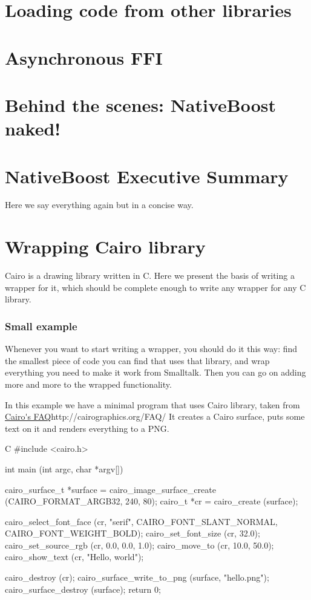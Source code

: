 \documentclass[a4paper,10pt,twoside]{book}
\begin{document}
\section{Loading code from other libraries}

\section{Asynchronous FFI}

\section{Behind the scenes: NativeBoost naked!}

\section{NativeBoost Executive Summary}

Here we say everything again but in a concise way. 

\section{Wrapping Cairo library}

Cairo is a drawing library written in C. Here we present the basis of writing a wrapper for it, which should be
complete enough to write any wrapper for any C library.


\subsubsection*{Small example}

Whenever you want to start writing a wrapper, you should do it this way: find the smallest piece of code you can find 
that uses that library, and wrap everything you need to make it work from Smalltalk. Then you can go on adding more and
more to the wrapped functionality. 

In this example we have a minimal program that uses Cairo library, taken from \url{Cairo's FAQ}{http://cairographics.org/FAQ/}
It creates a Cairo surface, puts some text on it
and renders everything to a PNG.

\begin{code}{C}
#include <cairo.h>

int
main (int argc, char *argv[])
{
        cairo_surface_t *surface =
            cairo_image_surface_create (CAIRO_FORMAT_ARGB32, 240, 80);
        cairo_t *cr =
            cairo_create (surface);

        cairo_select_font_face (cr, "serif", CAIRO_FONT_SLANT_NORMAL, CAIRO_FONT_WEIGHT_BOLD);
        cairo_set_font_size (cr, 32.0);
        cairo_set_source_rgb (cr, 0.0, 0.0, 1.0);
        cairo_move_to (cr, 10.0, 50.0);
        cairo_show_text (cr, "Hello, world");

        cairo_destroy (cr);
        cairo_surface_write_to_png (surface, "hello.png");
        cairo_surface_destroy (surface);
        return 0;
}
\end{code}
\end{document}
